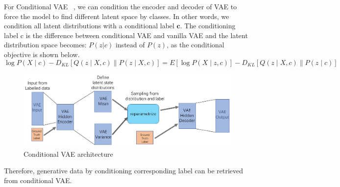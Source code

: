 For Conditional VAE ~\cite{cvae}, we can condition the encoder and decoder of VAE to force the model to find different latent space by classes. In other words, we condition all latent distributions with a conditional label $\mathbf{c}$. The conditioning label c is the difference between conditional VAE and vanilla VAE and the latent distribution space becomes: $P(z|c)$ instead of $P(z)$, as the conditional objective is shown below.
$$  
\log P(X \mid c)-D_{K L}[Q(z \mid X, c) \| P(z \mid X, c)]=E[\log P(X \mid z, c)]-D_{K L}[Q(z \mid X, c) \| P(z \mid c)]
$$
\begin{figure}[hbt!]
\includegraphics[width=\textwidth]{images/reimg4.png}  
\caption{Conditional VAE architecture}
\label{figure4}  
\end{figure}

Therefore, generative data by conditioning corresponding label can be retrieved from conditional VAE.
